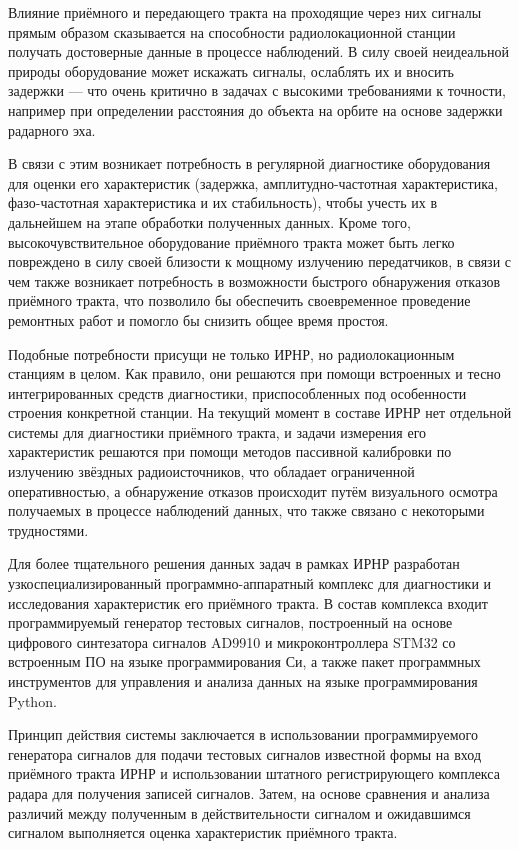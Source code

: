 \documentclass{report}
\begin{document}
Влияние приёмного и передающего тракта на проходящие через них сигналы прямым образом сказывается на способности радиолокационной станции получать достоверные данные в процессе наблюдений. В силу своей неидеальной природы оборудование может искажать сигналы, ослаблять их и вносить задержки --- что очень критично в задачах с высокими требованиями к точности, например при определении расстояния до объекта на орбите на основе задержки радарного эха.

В связи с этим возникает потребность в регулярной диагностике оборудования для оценки его характеристик (задержка, амплитудно-частотная характеристика, фазо-частотная характеристика и их стабильность), чтобы учесть их в дальнейшем на этапе обработки полученных данных. Кроме того, высокочувствительное оборудование приёмного тракта может быть легко повреждено в силу своей близости к мощному излучению передатчиков, в связи с чем также возникает потребность в возможности быстрого обнаружения отказов приёмного тракта, что позволило бы обеспечить своевременное проведение ремонтных работ и помогло бы снизить общее время простоя.

Подобные потребности присущи не только ИРНР, но радиолокационным станциям в целом. Как правило, они решаются при помощи встроенных и тесно интегрированных средств диагностики, приспособленных под особенности строения конкретной станции. На текущий момент в составе ИРНР нет отдельной системы для диагностики приёмного тракта, и задачи измерения его характеристик решаются при помощи методов пассивной калибровки по излучению звёздных радиоисточников, что обладает ограниченной оперативностью, а обнаружение отказов происходит путём визуального осмотра получаемых в процессе наблюдений данных, что также связано с некоторыми трудностями.

Для более тщательного решения данных задач в рамках ИРНР разработан узкоспециализированный программно-аппаратный комплекс для диагностики и исследования характеристик его приёмного тракта. В состав комплекса входит программируемый генератор тестовых сигналов, построенный на основе цифрового синтезатора сигналов AD9910 и микроконтроллера STM32 со встроенным ПО на языке программирования Си, а также пакет программных инструментов для управления и анализа данных на языке программирования Python.

Принцип действия системы заключается в использовании программируемого генератора сигналов для подачи тестовых сигналов известной формы на вход приёмного тракта ИРНР и использовании штатного регистрирующего комплекса радара для получения записей сигналов. Затем, на основе сравнения и анализа различий между полученным в действительности сигналом и ожидавшимся сигналом выполняется оценка характеристик приёмного тракта.
\end{document}
